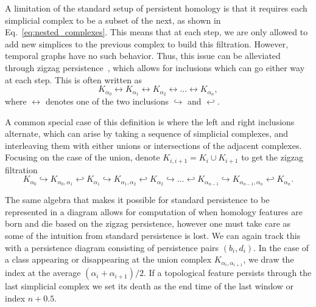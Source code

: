 %
%
%
%
%
%
%
%
%
%
%
%
%
%
%
%
%
%
%
%
%
%
%
%
%
%
%
%
%
%
%
%
%
%
%
%
%
%


A limitation of the standard setup of persistent homology is that it requires each simplicial complex to be a subset of the next, as shown in Eq.~\eqref{eq:nested_complexes}.
This means that at each step, we are only allowed to add new simplices to the previous complex to build this filtration. 
However, temporal graphs have no such behavior.
%
%
Thus, this issue can be alleviated through zigzag persistence~\cite{Carlsson2010, Carlsson2009a}, which allows for inclusions which can go either way at each step. 
This is often written as 
\begin{equation}
K_{\alpha_0} \leftrightarrow K_{\alpha_1} \leftrightarrow K_{\alpha_2} \leftrightarrow \ldots \leftrightarrow K_{\alpha_n},
\label{eq:bi_directional_zigzag_complexes}
\end{equation}
where $\leftrightarrow$ denotes one of the two inclusions $\hookrightarrow$ and $\hookleftarrow$. 

A common special case of this definition is where the left and right inclusions alternate, which can arise by taking a sequence of simplicial complexes, and interleaving them with either unions or intersections of the adjacent complexes.
Focusing on the case of the union, denote $K_{i,i+1} = K_i \cup K_{i+1}$ to get the zigzag filtration
\begin{equation*}
K_{\alpha_0} \hookrightarrow K_{\alpha_0,\alpha_1} 
\hookleftarrow K_{\alpha_1} 
\hookrightarrow K_{\alpha_1,\alpha_2} 
\hookleftarrow K_{\alpha_2} 
\hookrightarrow \ldots 
\hookleftarrow K_{\alpha_{n-1}}  
\hookrightarrow K_{\alpha_{n-1},\alpha_{n}} 
\hookleftarrow K_{\alpha_n}.
%
\end{equation*}
%

%




The same algebra that makes it possible for standard persistence to be represented in a diagram allows for computation of when homology features are born and die based on the zigzag persistence, however one must take care as some of the intuition from standard persistence is lost.
We can again track this with a persistence diagram consisting of persistence pairs $(b_i, d_i)$. 
In the case of a class appearing or disappearing at the union complex $K_{\alpha_{i},\alpha_{i+1}}$, we draw the index at the average $(\alpha_i+\alpha_{i+1})/2$.
If a topological feature persists through the last simplicial complex we set its death as the end time of the last window or index $n+0.5$. 
%


